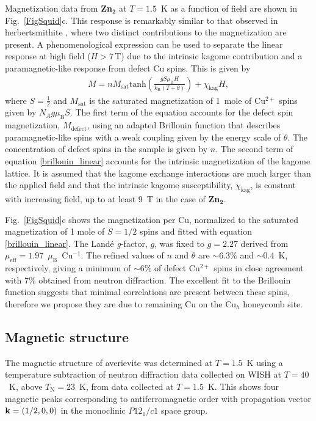 \documentclass[
sn-nature,
Numbered,
iicol]
{sn-jnl}%
\newcommand{\uB}{\ensuremath{\mu_\textrm{B}}}
\begin{document}
Magnetization data from {\bf Zn$\mathbf {_2}$} at $T=1.5$~K as a function of field are shown in Fig.~\ref{FigSquid}c. 
This response is remarkably similar to that observed in herbertsmithite \cite{Bert2009}, where two distinct contributions to the magnetization are present. 
A phenomenological expression can be used to separate the linear response at high field ($H > 7$\,T) due to the intrinsic kagome contribution and a paramagnetic-like response from defect Cu spins.
This is given by
\begin{align}
 \label{brillouin_linear}
   M = nM_\textrm{sat}\textrm{tanh}\left(\frac{gS\uB H}{k_{{\textrm{B}}}(T+\theta)}\right)+\chi_\textrm{kag} H,  
\end{align}
%
where $S=\frac{1}{2}$ and $M_\mathrm{sat}$ is the saturated magnetization of 1~mole of Cu$^{2+}$ spins given by $N_Ag\uB S$. 
The first term of the equation accounts for the defect spin magnetization, $M_\mathrm{defect}$, using an adapted Brillouin function that describes paramagnetic-like spins with a weak coupling given by the energy scale of $\theta$. 
The concentration of defect spins in the sample is given by $n$. 
The second term of equation \ref{brillouin_linear} accounts for the intrinsic magnetization of the kagome lattice. 
It is assumed that the kagome exchange interactions are much larger than the applied field and that the intrinsic kagome susceptibility, $\chi_\textrm{kag}$, is constant with increasing field, up to at least 9~T in the case of  {\bf Zn$\mathbf {_2}$}.

Fig.~\ref{FigSquid}c shows the magnetization per Cu, normalized to the saturated magnetization of 1 mole of $S=1/2$ spins and fitted with equation \ref{brillouin_linear}. 
The Land\'e \textit{g}-factor, $g$, was fixed to $g=2.27$ derived from $\mu_\mathrm{eff}=1.97$~$\uB$~Cu$^{-1}$. 
The refined values of $n$ and $\theta$ are $\sim6.3$\% and $\sim0.4$~K, respectively, giving a minimum of $\sim6$\% of defect Cu$^{2+}$ spins in close agreement with 7\% obtained from neutron diffraction. 
The excellent fit to the Brillouin function suggests that minimal correlations are present between these spins, therefore we propose they are due to remaining Cu on the Cu$_h$ honeycomb site. 


 
 \subsection{Magnetic structure}
The magnetic structure of averievite was determined at $T=1.5$~K using a temperature subtraction of neutron diffraction data collected on WISH at $T=40$~K, above $T_\mathrm{N}=23$~K, from data collected at $T=1.5$~K.
This shows four magnetic peaks corresponding to antiferromagnetic order with propagation vector ${\bf k}=(1/2,0,0)$ in the monoclinic $P12_1/c1$ space group.
\end{document}
